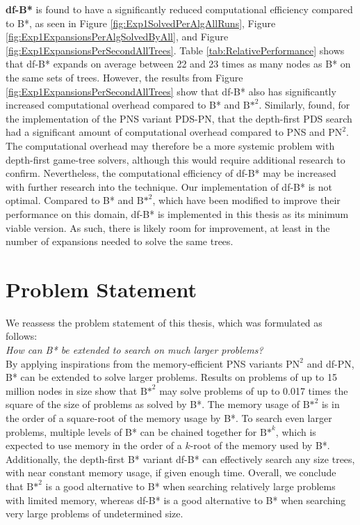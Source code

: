 \noindent \textbf{df-B*} is found to have a significantly reduced computational efficiency compared to B*, as seen in Figure \ref{fig:Exp1SolvedPerAlgAllRuns}, Figure \ref{fig:Exp1ExpansionsPerAlgSolvedByAll}, and Figure \ref{fig:Exp1ExpansionsPerSecondAllTrees}. Table \ref{tab:RelativePerformance} shows that df-B* expands on average between 22 and 23 times as many nodes as B* on the same sets of trees.
However, the results from Figure \ref{fig:Exp1ExpansionsPerSecondAllTrees} show that df-B* also has significantly increased computational overhead compared to B* and ${\text{B*}}^2$. Similarly,  found, for the implementation of the PNS variant PDS-PN, that the depth-first PDS search \cite{Nagai1999} had a significant amount of computational overhead compared to PNS and ${\text{PN}}^2$.
The computational overhead may therefore be a more systemic problem with depth-first game-tree solvers, although this would require additional research to confirm.
Nevertheless, the computational efficiency of df-B* may be increased with further research into the technique. Our implementation of df-B* is not optimal. Compared to B* and ${\text{B*}}^2$, which have been modified to improve their performance on this domain, df-B* is implemented in this thesis as its minimum viable version. As such, there is likely room for improvement, at least in the number of expansions needed to solve the same trees.

\section{Problem Statement}
\label{sec:Conclusions:ProblemStatement}
We reassess the problem statement of this thesis, which was formulated as follows:
\\[1\baselineskip]
\textit{How can B* be extended to search on much larger problems?}
\\[1\baselineskip]
By applying inspirations from the memory-efficient PNS variants ${\text{PN}}^2$ and df-PN, B* can be extended to solve larger problems. Results on problems of up to 15 million nodes in size show that ${\text{B*}}^2$ may solve problems of up to 0.017 times the square of the size of problems as solved by B*. The memory usage of ${\text{B*}}^2$ is in the order of a square-root of the memory usage by B*. To search even larger problems, multiple levels of B* can be chained together for ${\text{B*}}^k$, which is expected to use memory in the order of a $k$-root of the memory used by B*. Additionally, the depth-first B* variant df-B* can effectively search any size trees, with near constant memory usage, if given enough time. Overall, we conclude that ${\text{B*}}^2$ is a good alternative to B* when searching relatively large problems with limited memory, whereas df-B* is a good alternative to B* when searching very large problems of undetermined size.
